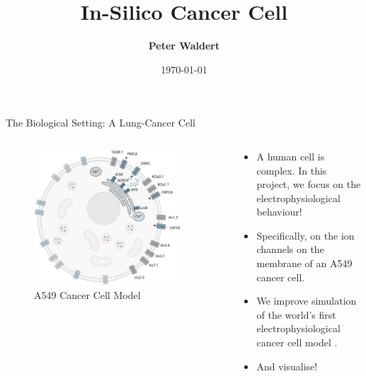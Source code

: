 \documentclass[aspectratio=169, hyperref={colorlinks=true}]{beamer}
\title[IVC Seminar SS2025]{In-Silico Cancer Cell}
\author[Peter Waldert]{\textbf{Peter Waldert}}
\date{\today}
\institute{IVC}
\begin{document}
  \begin{frame}[plain]
    \maketitle
  \end{frame}

  \begin{frame}{The Biological Setting: A Lung-Cancer Cell}
    \begin{columns}
      \begin{column}{0.42\textwidth}
        \vspace*{-0.4cm}
        \begin{figure}
          \includegraphics[width=0.9\textwidth]{../../figures/cell-by-langthaler-et-al.png}
          \caption{A549 Cancer Cell Model \cite{2021-A549-model}}
        \end{figure}
      \end{column}
      \begin{column}{0.58\textwidth}
        \begin{itemize}
          \item A human cell is complex. In this project, we focus on the electrophysiological behaviour! \pause
          \item Specifically, on the ion channels on the membrane of an A549 cancer cell. \pause
          \item We improve simulation of the world's first electrophysiological cancer cell model \cite{2021-A549-model}.
          \item And visualise!
        \end{itemize}
      \end{column}
    \end{columns}
  \end{frame}
\end{document}
